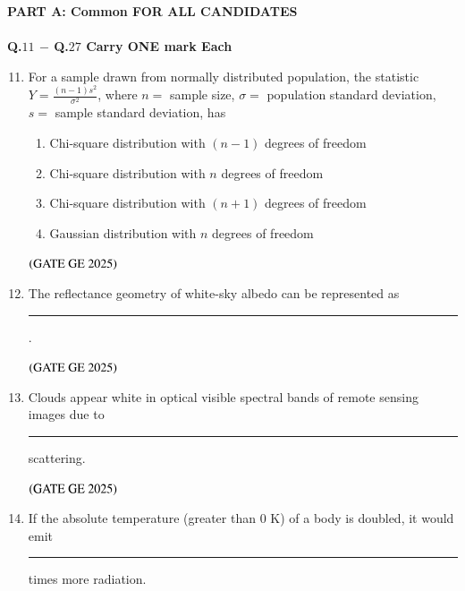 \documentclass[journal,12pt,onecolumn]{IEEEtran}
\theoremstyle{remark}
\begin{document}
\textbf{PART A: Common FOR ALL CANDIDATES}\\
\\
\textbf{Q.$11$ $-$ Q.$27$ Carry ONE mark Each}\\

\begin{enumerate}
\setcounter{enumi}{10}
\item For a sample drawn from normally distributed population, the statistic $Y = \frac{(n-1)s^2}{\sigma^2}$, where $n =$ sample size, $\sigma =$ population standard deviation, $s =$ sample standard deviation, has
\begin{enumerate}
\item Chi-square distribution with $(n-1)$ degrees of freedom
\item Chi-square distribution with $n$ degrees of freedom
\item Chi-square distribution with $(n+1)$ degrees of freedom
\item Gaussian distribution with $n$ degrees of freedom
\end{enumerate}
\hfill $\left(\text{GATE GE 2025}\right)$
\bigskip
\item The reflectance geometry of white-sky albedo can be represented as \rule{2cm}{0.5mm}.
\begin{enumerate}
\end{enumerate}
\hfill $\left(\text{GATE GE 2025}\right)$
\bigskip
\item Clouds appear white in optical visible spectral bands of remote sensing images due to \rule{2cm}{0.5mm} scattering.
\begin{enumerate}
\end{enumerate}
\hfill $\left(\text{GATE GE 2025}\right)$
\bigskip
\item If the absolute temperature (greater than 0 K) of a body is doubled, it would emit \rule{2cm}{0.5mm} times more radiation.

\end{enumerate}
\end{document}
